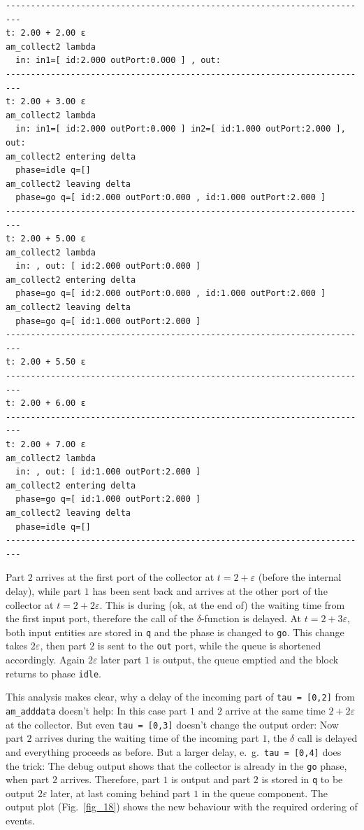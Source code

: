 \documentclass[12pt,oneside,a4paper,bibtotoc,BCOR=0pt,DIV=20]{scrreprt}
\newcommand{\cft}[1]{\mbox{\texttt{#1}}}   %
\newcommand{\epsi}{\varepsilon}
\begin{document}
\begin{verbatim}
-------------------------------------------------------------------------
t: 2.00 + 2.00 ε
am_collect2 lambda
  in: in1=[ id:2.000 outPort:0.000 ] , out: 
-------------------------------------------------------------------------
t: 2.00 + 3.00 ε
am_collect2 lambda
  in: in1=[ id:2.000 outPort:0.000 ] in2=[ id:1.000 outPort:2.000 ], out:
am_collect2 entering delta
  phase=idle q=[] 
am_collect2 leaving delta
  phase=go q=[ id:2.000 outPort:0.000 , id:1.000 outPort:2.000 ]
-------------------------------------------------------------------------
t: 2.00 + 5.00 ε
am_collect2 lambda
  in: , out: [ id:2.000 outPort:0.000 ]
am_collect2 entering delta
  phase=go q=[ id:2.000 outPort:0.000 , id:1.000 outPort:2.000 ]
am_collect2 leaving delta
  phase=go q=[ id:1.000 outPort:2.000 ]
-------------------------------------------------------------------------
t: 2.00 + 5.50 ε
-------------------------------------------------------------------------
t: 2.00 + 6.00 ε
-------------------------------------------------------------------------
t: 2.00 + 7.00 ε
am_collect2 lambda
  in: , out: [ id:1.000 outPort:2.000 ]
am_collect2 entering delta
  phase=go q=[ id:1.000 outPort:2.000 ]
am_collect2 leaving delta
  phase=idle q=[] 
-------------------------------------------------------------------------
\end{verbatim}

Part $2$ arrives at the first port of the collector at $t = 2 + \epsi$
(before the internal delay), while part $1$ has been sent back and arrives
at the other port of the collector at $t = 2 + 2\epsi$. This is during (ok, at
the end of) the waiting time from the first input port, therefore the call of
the $\delta$-function is delayed. At $t = 2 + 3\epsi$, both input entities are
stored in \cft{q} and the phase is changed to \cft{go}. This change takes
$2\epsi$, then part $2$ is sent to the \cft{out} port, while the queue is
shortened accordingly. Again $2\epsi$ later part $1$ is output, the queue
emptied and the block returns to phase \cft{idle}.

This analysis makes clear, why a delay of the incoming part of \cft{tau =
  [0,2]} from \cft{am\_adddata} doesn't help: In this case part $1$ and $2$
arrive at the same time $2 + 2\epsi$ at the collector. But even \cft{tau =
  [0,3]} doesn't change the output order: Now part $2$ arrives during the
waiting time of the incoming part $1$, the $\delta$ call is delayed and
everything proceeds as before. But a larger delay, e.\ g.\ \cft{tau = [0,4]}
does the trick: The debug output shows that the collector is already in the
\cft{go} phase, when part $2$ arrives. Therefore, part $1$ is output and part
$2$ is stored in \cft{q} to be output $2\epsi$ later, at last coming behind
part $1$ in the queue component.  The output plot (Fig.\ \ref{fig_18}) shows
the new behaviour with the required ordering of events.
\end{document}
